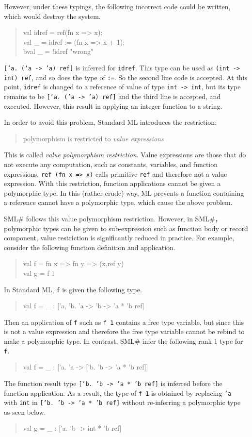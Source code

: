 \documentclass{jbook}
\newcommand{\smlsharp}{SML\#}
\newenvironment{program}{\begin{quote}\begin{tt}}%
                        {\end{tt}\end{quote}}
\begin{document}
	However, under these typings, the following incorrect code could 
be written, which would destroy the system.
\begin{program}
val idref = ref(fn x => x);\\
val \_ = idref := (fn x => x + 1);\\
bval \_ = !idref "wrong"
\end{program}
	{\tt ['a. ('a -> 'a) ref]} is inferred for {\tt idref}.
	This type can be used as {\tt (int -> int) ref}, and 
so does the type of {\tt :=}.
	So the second line code is accepted.
	At this point, {\tt idref} is changed to a reference of value of
type {\tt int -> int}, but its type remains to be {\tt ['a. ('a -> 'a)
ref]} and the third line is accepted, and executed.
	However, this result in applying an integer function to a string.

	In order to avoid this problem, Standard ML introduces the
restriction:
\begin{quote}
polymorphism is restricted to {\em value expressions}
\end{quote}
	This is called {\em value polymorphism restriction}.
	Value expressions are those that do not execute any computation,
such as constants, variables, and function expressions.
	{\tt ref (fn x => x)} calls primitive {\tt ref} and therefore
not a value expression.
	With this restriction, function applications cannot be given a
polymorphic type.
	In this (rather crude) way, ML prevents a function containing a
reference cannot have a polymorphic type, which cause the above problem.

	\smlsharp{} follows this value polymorphism restriction.
	However, in \smlsharp{}，polymorphic types can be given to
sub-expression such as function body or record component, value
restriction is significantly reduced in practice.
	For example, consider the following function definition and
application.
\begin{program}
val f = fn x => fn y => (x,ref y)\\
val g = f 1\\
\end{program}
	In Standard ML, {\tt f} is given the following type.
\begin{program}
val f = \_ : ['a, 'b. 'a -> 'b -> 'a * 'b ref]
\end{program}
	Then an application of {\tt f} such as {\tt f\ 1} contains a
free type variable, but since this is not a value expression and
therefore the free type variable cannot be rebind to make a polymorphic
type.
	In contrast, \smlsharp{} infer the following rank 1 type for
{\tt f}.
\begin{program}
val f = \_ : ['a. 'a -> ['b. 'b -> 'a * 'b ref]]
\end{program}
	The function result type {\tt ['b. 'b -> 'a * 'b ref]} is
inferred before the function application.
	As a result, the type of {\tt f\ 1} is obtained by replacing
{\tt 'a } with {\tt int} in {\tt ['b. 'b -> 'a * 'b ref]} without
re-inferring a polymorphic type as seen below.
\begin{program}
val g = \_ :  ['a. 'b -> int * 'b ref]
\end{program}
\fi%
\end{document}
